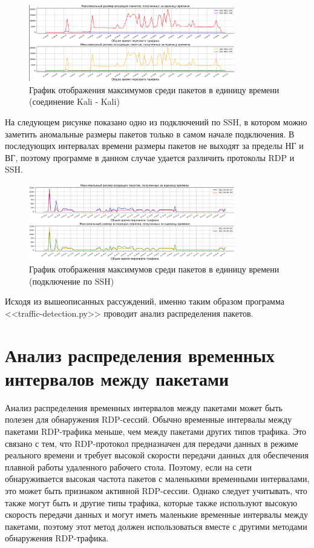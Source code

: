 \documentclass[bachelor, och, coursework]{SCWorks}
\begin{document}
\begin{figure}[H]
  \centering
  \includegraphics[width=0.8\textwidth]{photo/size-kal.png}
  \caption{График отображения максимумов среди пакетов в единицу времени (соединение Kali - Kali)}
  \label{kali-size}
\end{figure}

На следующем рисунке показано одно из подключений по SSH, в котором можно заметить аномальные размеры
пакетов только в самом начале подключения. В последующих интервалах времени размеры пакетов не выходят за пределы 
НГ и ВГ, поэтому программе в данном случае удается различить протоколы RDP и SSH.


\begin{figure}[H]
  \centering
  \includegraphics[width=0.8\textwidth]{photo/size-ssh.png}
  \caption{График отображения максимумов среди пакетов в единицу времени (подключение по SSH)}
  \label{ssh-size}
\end{figure}


Исходя из вышеописанных рассуждений, именно таким образом программа <<traffic-detection.py>> 
проводит анализ распределения пакетов.


\section{Анализ распределения временных интервалов между пакетами}

Анализ распределения временных интервалов между пакетами может быть полезен для обнаружения RDP-сессий. 
Обычно временные интервалы между пакетами RDP-трафика меньше, чем между пакетами других типов трафика. 
Это связано с тем, что RDP-протокол предназначен для передачи данных в режиме реального времени и требует 
высокой скорости передачи данных для обеспечения плавной работы удаленного рабочего стола. Поэтому, если 
на сети обнаруживается высокая частота пакетов с маленькими временными интервалами, это может быть признаком 
активной RDP-сессии. Однако следует учитывать, что также могут быть и другие типы трафика, которые также используют 
высокую скорость передачи данных и могут иметь маленькие временные интервалы между пакетами, поэтому этот метод должен 
использоваться вместе с другими методами обнаружения RDP-трафика.
 
\end{document}

